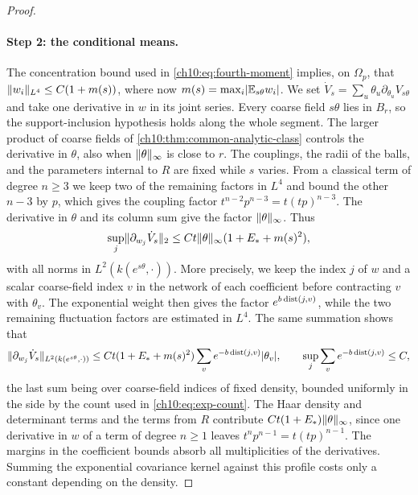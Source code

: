 \begin{proof}
\paragraph{Step 2: the conditional means.}
The concentration bound used in \eqref{ch10:eq:fourth-moment} implies, on $\Omega_p$, that $\lVert w_i\rVert_{L^4}\le C(1+m(s))$, where now $m(s)=\max_i\lvert \mathbb E_{s\theta}w_i\rvert$. We set $\dot V_s=\sum_u\theta_u\partial_{\theta_u}V_{s\theta}$ and take one derivative in $w$ in its joint series. Every coarse field $s\theta$ lies in $B_r$, so the support-inclusion hypothesis holds along the whole segment. The larger product of coarse fields of \cref{ch10:thm:common-analytic-class} controls the derivative in $\theta$, also when $\lVert \theta\rVert_\infty$ is close to $r$. The couplings, the radii of the balls, and the parameters internal to $R$ are fixed while $s$ varies. From a classical term of degree $n\ge3$ we keep two of the remaining factors in $L^4$ and bound the other $n-3$ by $p$, which gives the coupling factor $t^{n-2}p^{n-3}=t(tp)^{n-3}$. The derivative in $\theta$ and its column sum give the factor $\lVert \theta\rVert_\infty$. Thus
\begin{equation}\label{ch10:eq:target-l2-force}
 \sup_j\lVert \partial_{w_j}\dot V_s\rVert_2\le Ct\lVert \theta\rVert_\infty(1+E_*+m(s)^2),
\end{equation}
with all norms in $L^2(k(e^{s\theta},\cdot))$. More precisely, we keep the index $j$ of $w$ and a scalar coarse-field index $v$ in the network of each coefficient before contracting $v$ with $\theta_v$. The exponential weight then gives the factor $e^{b\operatorname{dist}(j,v)}$, while the two remaining fluctuation factors are estimated in $L^4$. The same summation shows that
\begin{equation}\label{ch10:eq:target-force-profile}
 \lVert \partial_{w_j}\dot V_s\rVert_{L^2(k(e^{s\theta},\cdot))}\le Ct(1+E_*+m(s)^2)\sum_ve^{-b\operatorname{dist}(j,v)}\lvert \theta_v\rvert,\qquad \sup_j\sum_ve^{-b\operatorname{dist}(j,v)}\le C,
\end{equation}
the last sum being over coarse-field indices of fixed density, bounded uniformly in the side by the count used in \eqref{ch10:eq:exp-count}. The Haar density and determinant terms and the terms from $R$ contribute $Ct(1+E_*)\lVert \theta\rVert_\infty$, since one derivative in $w$ of a term of degree $n\ge1$ leaves $t^np^{n-1}=t(tp)^{n-1}$. The margins in the coefficient bounds absorb all multiplicities of the derivatives. Summing the exponential covariance kernel against this profile costs only a constant depending on the density.


\end{proof}
